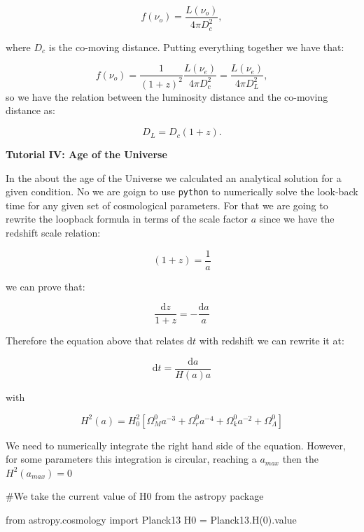 \documentclass[
  letterpaper,
  DIV=11,
  numbers=noendperiod]{scrreprt}
\newenvironment{Shaded}{\begin{snugshade}}{\end{snugshade}}
\newcommand{\CommentTok}[1]{\textcolor[rgb]{0.37,0.37,0.37}{#1}}
\newcommand{\DecValTok}[1]{\textcolor[rgb]{0.68,0.00,0.00}{#1}}
\newcommand{\ImportTok}[1]{\textcolor[rgb]{0.00,0.46,0.62}{#1}}
\newcommand{\NormalTok}[1]{\textcolor[rgb]{0.00,0.23,0.31}{#1}}
\newcommand{\OperatorTok}[1]{\textcolor[rgb]{0.37,0.37,0.37}{#1}}
\begin{document}
\[f(\nu_o) = \frac{L(\nu_o)}{4\pi D_c^2},\]

where \(D_c\) is the co-moving distance. Putting everything together we
have that:

\[f(\nu_o) = \frac{1}{(1+z)^2}\frac{L(\nu_e)}{4\pi D_c^2} = \frac{L(\nu_e)}{4\pi D_L^2},\]
so we have the relation between the luminosity distance and the
co-moving distance as:

\[D_L = D_c(1+z).\]

\begin{tcolorbox}[enhanced jigsaw, toprule=.15mm, colframe=quarto-callout-color-frame, bottomrule=.15mm, leftrule=.75mm, left=2mm, breakable, rightrule=.15mm, arc=.35mm, opacityback=0, colback=white]

\vspace{-3mm}\textbf{Tutorial IV: Age of the Universe}\vspace{3mm}

In the about the age of the Universe we calculated an analytical
solution for a given condition. No we are goign to use \texttt{python}
to numerically solve the look-back time for any given set of
cosmological parameters. For that we are going to rewrite the loopback
formula in terms of the scale factor \(a\) since we have the redshift
scale relation:

\[(1+z) = \frac{1}{a}\]

we can prove that:

\[\frac{\mathrm{ d}z}{1 +z} = -\frac{\mathrm{ d}a}{a}\]

Therefore the equation above that relates \(\mathrm{d}t\) with redshift
we can rewrite it at:

\[ \mathrm{ d}t = \frac{\mathrm{d}a}{H(a)a} \]

with

\[  H^2(a) = H^2_0 [\Omega^0_M a^{-3} + \Omega^0_r a^{-4} + \Omega^0_k a^{-2} +\Omega^0_\Lambda] \]

We need to numerically integrate the right hand side of the equation.
However, for some parameters this integration is circular, reaching a
\(a_{max}\) then the \(H^2(a_{max}) = 0\)

\begin{Shaded}
\begin{Highlighting}[]
\CommentTok{\#We take the current value of H0 from the astropy package}

\ImportTok{from}\NormalTok{ astropy.cosmology }\ImportTok{import}\NormalTok{ Planck13}
\NormalTok{H0 }\OperatorTok{=}\NormalTok{ Planck13.H(}\DecValTok{0}\NormalTok{).value}


\end{Highlighting}
\end{Shaded}
\end{tcolorbox}
\end{document}
